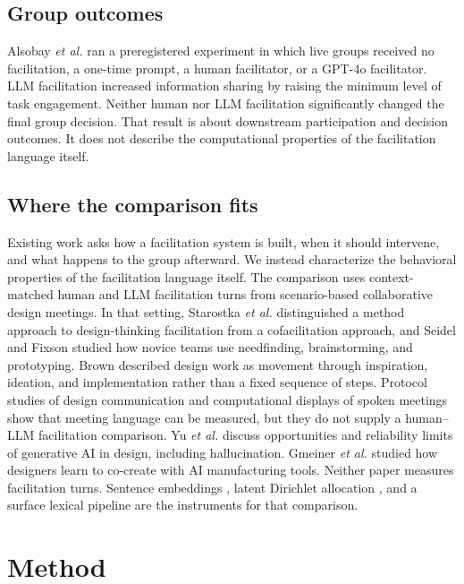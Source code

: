 \documentclass[11pt]{article}
\begin{document}
\subsection{Group outcomes}
Alsobay \emph{et al.} \citep{alsobay2026table} ran a preregistered experiment in which live groups received no facilitation, a one-time prompt, a human facilitator, or a GPT-4o facilitator. LLM facilitation increased information sharing by raising the minimum level of task engagement. Neither human nor LLM facilitation significantly changed the final group decision. That result is about downstream participation and decision outcomes. It does not describe the computational properties of the facilitation language itself.

\subsection{Where the comparison fits}
Existing work asks how a facilitation system is built, when it should intervene, and what happens to the group afterward. We instead characterize the behavioral properties of the facilitation language itself. The comparison uses context-matched human and LLM facilitation turns from scenario-based collaborative design meetings. In that setting, Starostka \emph{et al.} \citep{starostka2021} distinguished a method approach to design-thinking facilitation from a cofacilitation approach, and Seidel and Fixson \citep{seidel2013} studied how novice teams use needfinding, brainstorming, and prototyping. Brown \citep{brown2008} described design work as movement through inspiration, ideation, and implementation rather than a fixed sequence of steps. Protocol studies of design communication \citep{stempfle2002, kan2017} and computational displays of spoken meetings \citep{chandrasegaran2019} show that meeting language can be measured, but they do not supply a human--LLM facilitation comparison. Yu \emph{et al.} \citep{peng2025} discuss opportunities and reliability limits of generative AI in design, including hallucination. Gmeiner \emph{et al.} \citep{gmeiner2023} studied how designers learn to co-create with AI manufacturing tools. Neither paper measures facilitation turns. Sentence embeddings \citep{reimers2019}, latent Dirichlet allocation \citep{blei2003lda}, and a surface lexical pipeline are the instruments for that comparison.

\section{Method}
\end{document}
